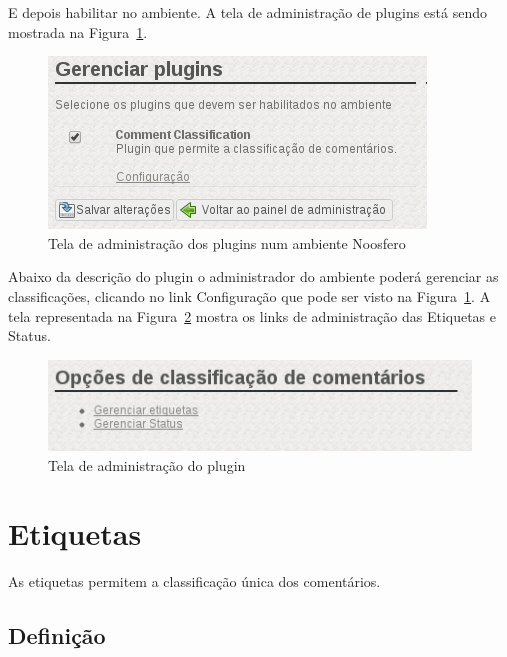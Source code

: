 \documentclass[11pt]{article}
\begin{document}
E depois habilitar no ambiente. A tela de administração de plugins está
sendo mostrada na Figura~\ref{fig:environment-admin-page}.

\begin{figure}[h]
\center
\includegraphics[scale=0.6]{environment-admin-page.png}
\caption{Tela de administração dos plugins num ambiente Noosfero}
\label{fig:environment-admin-page}
\end{figure}

Abaixo da descrição do plugin o administrador do ambiente poderá
gerenciar as classificações, clicando no link Configuração que pode ser
visto na Figura~\ref{fig:environment-admin-page}. A tela representada na
Figura~\ref{fig:plugin-admin-page} mostra os links de administração das
Etiquetas e Status.

\begin{figure}[h]
\center
\includegraphics[scale=0.6]{plugin-admin-page.png}
\caption{Tela de administração do plugin}
\label{fig:plugin-admin-page}
\end{figure}

\section{Etiquetas}

As etiquetas permitem a classificação única dos comentários.

\subsection{Definição}
\end{document}
